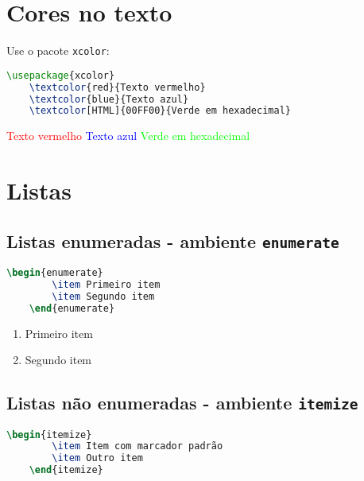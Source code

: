 \section{Cores no texto}

Use o pacote \verb|xcolor|:

\begin{lstlisting}[language=tex, caption=Uso do pacote \texttt{xcolor} para customização de cores no texto]
    \usepackage{xcolor}  
    \textcolor{red}{Texto vermelho}  
    \textcolor{blue}{Texto azul}  
    \textcolor[HTML]{00FF00}{Verde em hexadecimal}  
\end{lstlisting}

\textcolor{red}{Texto vermelho}  
\textcolor{blue}{Texto azul}  
\textcolor[HTML]{00FF00}{Verde em hexadecimal}  

\section{Listas}

\subsection{Listas enumeradas - ambiente \texttt{enumerate}}

\begin{lstlisting}[language=tex, caption=Listas enumeradas]
    \begin{enumerate}
        \item Primeiro item
        \item Segundo item
    \end{enumerate} 
\end{lstlisting}

\begin{enumerate}
    \item Primeiro item
    \item Segundo item
\end{enumerate}

\subsection{Listas não enumeradas - ambiente \texttt{itemize}}

\begin{lstlisting}[language=tex, caption=Listas não enumeradas]
    \begin{itemize}
        \item Item com marcador padrão
        \item Outro item
    \end{itemize}
\end{lstlisting}

